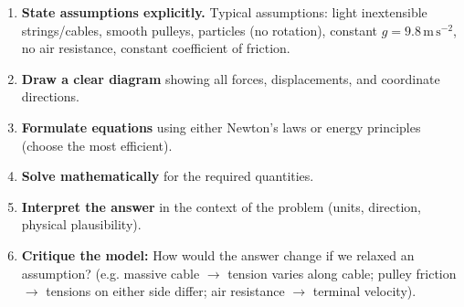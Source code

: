 \documentclass[11pt]{article}
\begin{document}
\begin{methode}
\begin{enumerate}
\item \textbf{State assumptions explicitly.}  Typical assumptions: light inextensible strings/cables, smooth pulleys, particles (no rotation), constant $g = 9.8\,\mathrm{m\,s^{-2}}$, no air resistance, constant coefficient of friction.
\item \textbf{Draw a clear diagram} showing all forces, displacements, and coordinate directions.
\item \textbf{Formulate equations} using either Newton's laws or energy principles (choose the most efficient).
\item \textbf{Solve mathematically} for the required quantities.
\item \textbf{Interpret the answer} in the context of the problem (units, direction, physical plausibility).
\item \textbf{Critique the model:} How would the answer change if we relaxed an assumption?  (e.g. massive cable $\rightarrow$ tension varies along cable; pulley friction $\rightarrow$ tensions on either side differ; air resistance $\rightarrow$ terminal velocity).
\end{enumerate}
\end{methode}
\end{document}
